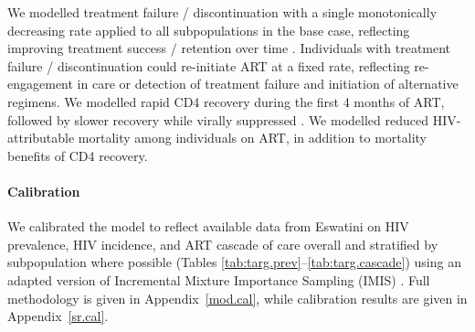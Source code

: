 We modelled treatment failure / discontinuation with a single monotonically decreasing rate
applied to all subpopulations in the base case,
reflecting improving treatment success / retention over time \cite{SHIMS2}.
Individuals with treatment failure / discontinuation could re-initiate ART at a fixed rate,
reflecting re-engagement in care or detection of treatment failure and initiation of alternative regimens.
We modelled rapid CD4 recovery during the first 4 months of ART,
followed by slower recovery while virally suppressed \cite{Gabillard2013}.
We modelled reduced HIV-attributable mortality among individuals on ART,
in addition to mortality benefits of CD4 recovery.
\paragraph{Calibration}
We calibrated the model to reflect
available data from Eswatini on HIV prevalence, HIV incidence, and ART cascade of care
overall and stratified by subpopulation where possible
(Tables \ref{tab:targ.prev}--\ref{tab:targ.cascade})
\cite{SDHS2006,SHIMS1,SHIMS2,SHIMS3,Baral2014,EswKP2014,EswIBBS2022}
using an adapted version of Incremental Mixture Importance Sampling (IMIS) \cite{Raftery2010}.
Full methodology is given in Appendix~\ref{mod.cal},
while calibration results are given in Appendix~\ref{sr.cal}.
